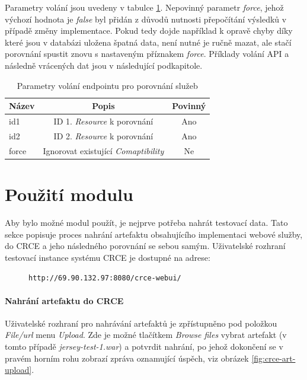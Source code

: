 \documentclass[czech,DP]{thesiskiv}
\begin{document}
Parametry volání jsou uvedeny v tabulce \ref{tab:rest-cmp-params}. Nepovinný parametr \textit{force}, jehož výchozí hodnota je \textit{false} byl přidán z důvodů nutnosti přepočítání výsledků v případě změny implementace. Pokud tedy dojde například k opravě chyby díky které jsou v databázi uložena špatná data, není nutné je ručně mazat, ale stačí porovnání spustit znovu s nastaveným příznakem \textit{force}. Příklady volání API a následně vrácených dat jsou v následující podkapitole.

\begin{table}[h]
	\centering
	\begin{tabular} {|l|c|c|}
		\hline
		Název & Popis & Povinný \\
		\hline
		\hline
		id1 & ID 1. \textit{Resource} k porovnání & Ano \\
		\hline
		id2 & ID 2. \textit{Resource} k porovnání & Ano \\
		\hline
		force & Ignorovat existující \textit{Comaptibility} & Ne \\
		\hline		
	\end{tabular}
	\caption{Parametry volání endpointu pro porovnání služeb}
	\label{tab:rest-cmp-params}
\end{table}

\section{Použití modulu}
\label{sec:module-how-to}

Aby bylo možné modul použít, je nejprve potřeba nahrát testovací data. Tato sekce popisuje proces nahrání artefaktu obsahujícího implementaci webové služby, do CRCE a jeho následného porovnání se sebou samým. Uživatelské rozhraní testovací instance systému CRCE je dostupné na adrese:

\begin{figure}[h]
	\centering
	\verb|http://69.90.132.97:8080/crce-webui/|
\end{figure}

\paragraph{Nahrání artefaktu do CRCE}

Uživatelské rozhraní pro nahrávání artefaktů je zpřístupněno pod položkou  \textit{File/url} menu \textit{Upload}. Zde je možné tlačítkem \textit{Browse files} vybrat artefakt (v tomto případě \textit{jersey-test-1.war})  a potvrdit nahrání, po jehož dokončení se v pravém horním rohu zobrazí zpráva oznamující úspěch, viz obrázek \ref{fig:crce-art-upload}.
\end{document}
